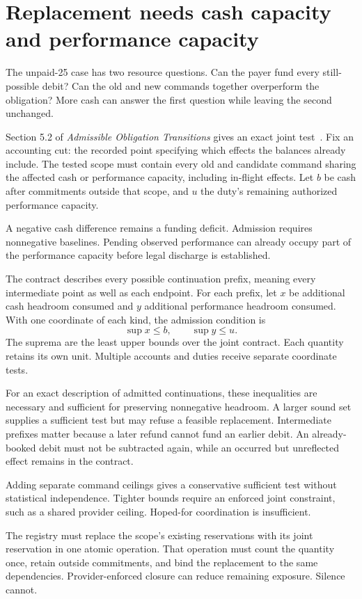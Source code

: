 \documentclass{momentum}
\begin{document}
\section{Replacement needs cash capacity and performance capacity}
\label{sec:reservations}

The unpaid-25 case has two resource questions. Can the payer fund every still-possible debit? Can the old and new commands together overperform the obligation? More cash can answer the first question while leaving the second unchanged.

Section 5.2 of \emph{Admissible Obligation Transitions} gives an exact joint test~\cite{aot}. Fix an accounting cut: the recorded point specifying which effects the balances already include. The tested scope must contain every old and candidate command sharing the affected cash or performance capacity, including in-flight effects. Let $b$ be cash after commitments outside that scope, and $u$ the duty's remaining authorized performance capacity.

A negative cash difference remains a funding deficit. Admission requires nonnegative baselines. Pending observed performance can already occupy part of the performance capacity before legal discharge is established.

The contract describes every possible continuation prefix, meaning every intermediate point as well as each endpoint. For each prefix, let $x$ be additional cash headroom consumed and $y$ additional performance headroom consumed. With one coordinate of each kind, the admission condition is
\[
 \sup x\le b,\qquad \sup y\le u.
\]
The suprema are the least upper bounds over the joint contract. Each quantity retains its own unit. Multiple accounts and duties receive separate coordinate tests.

For an exact description of admitted continuations, these inequalities are necessary and sufficient for preserving nonnegative headroom. A larger sound set supplies a sufficient test but may refuse a feasible replacement. Intermediate prefixes matter because a later refund cannot fund an earlier debit. An already-booked debit must not be subtracted again, while an occurred but unreflected effect remains in the contract.

Adding separate command ceilings gives a conservative sufficient test without statistical independence. Tighter bounds require an enforced joint constraint, such as a shared provider ceiling. Hoped-for coordination is insufficient.

The registry must replace the scope's existing reservations with its joint reservation in one atomic operation. That operation must count the quantity once, retain outside commitments, and bind the replacement to the same dependencies. Provider-enforced closure can reduce remaining exposure. Silence cannot.
\end{document}
